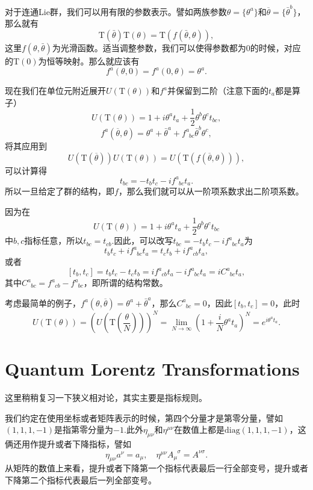 对于连通Lie群，我们可以用有限的参数表示。譬如两族参数$\theta=\{\theta^a\}$和$\overline{\theta}=\{\bar{\theta}^b\}$，那么就有
\[
\mathrm{T}(\bar{\theta})\mathrm{T}(\theta)=\mathrm{T}(f(\bar{\theta},\theta)),
\]
这里$f(\theta,\bar{\theta})$为光滑函数。适当调整参数，我们可以使得参数都为0的时候，对应的$\mathrm{T}(0)$为恒等映射。那么就应该有
\[
f^a(\theta,0)=f^a(0,\theta)=\theta^a.
\]

现在我们在单位元附近展开$U(\mathrm{T}(\theta))$和$f^a$并保留到二阶（注意下面的$t_a$都是算子）
\[
U(\mathrm{T}(\theta))=1+i\theta^at_a+\frac{1}{2}\theta^b\theta^ct_{bc},
\]
\[
f^a(\overline{\theta},\theta)=\theta^a+\bar{\theta}^a+f^a_{\phantom{a}bc}\bar{\theta}^b\theta^c,
\]
将其应用到
\[
U(\mathrm{T}(\overline{\theta}))U(\mathrm{T}(\theta))=U(\mathrm{T}(f(\overline{\theta},\theta))),
\]
可以计算得
\[
t_{bc}=-t_bt_c-if^a_{\phantom{a}bc}t_a.
\]
所以一旦给定了群的结构，即$f$，那么我们就可以从一阶项系数求出二阶项系数。

因为在
\[
U(\mathrm{T}(\theta))=1+i\theta^at_a+\frac{1}{2}\theta^b\theta^ct_{bc}
\]
中$b,c$指标任意，所以$t_{bc}=t_{cb}$.因此，可以改写$t_{bc}=-t_bt_c-if^a_{\phantom{a}bc}t_a$为
\[
t_bt_c+if^a_{\phantom{a}bc}t_a=t_ct_b+if^a_{\phantom{a}cb}t_a,
\]
或者
\[
[t_b,t_c]=t_bt_c-t_ct_b=if^a_{\phantom{a}cb}t_a-if^a_{\phantom{a}bc}t_a=iC^a_{\phantom{a}bc}t_a,
\]
其中$C^a_{\phantom{a}bc}=f^a_{\phantom{a}cb}-f^a_{\phantom{a}bc}$，即所谓的结构常数。

考虑最简单的例子，$f^a(\theta,\overline{\theta})=\theta^a+\bar{\theta}^a$，那么$C^a_{\phantom{a}bc}=0$，因此$[t_b,t_c]=0$，此时
\[
U(\mathrm{T}(\theta))=\left(U\left(\mathrm{T}\left(\frac{\theta}{N}\right)\right)\right)^N=\lim_{N\to \infty}\left(1+\frac{i}{N}\theta^at_a\right)^N=e^{i\theta^at_a}.
\]
\section{Quantum Lorentz Transformations}
这里稍稍复习一下狭义相对论，其实主要是指标规则。

我们约定在使用坐标或者矩阵表示的时候，第四个分量才是第零分量，譬如$(1,1,1,-1)$是指第零分量为$-1$.此外$\eta_{\mu\nu}$和$\eta^{\mu\nu}$在数值上都是$\mathrm{diag}(1,1,1,-1)$，这俩还用作提升或者下降指标，譬如
\[
\eta_{\mu\nu}a^\nu=a_\mu,\quad \eta^{\mu\nu}A_\mu^{\phantom{\mu}\sigma}=A^{\nu\sigma}.
\]
从矩阵的数值上来看，提升或者下降第一个指标代表最后一行全部变号，提升或者下降第二个指标代表最后一列全部变号。

